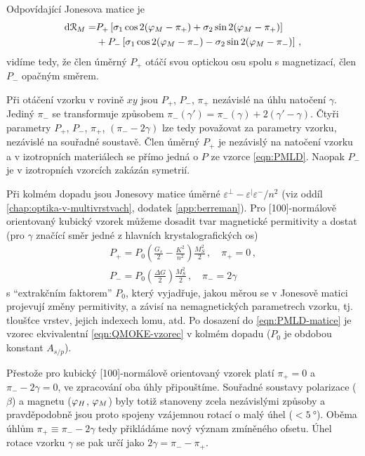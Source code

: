 Odpovídající Jonesova matice je 
\begin{align}
    \label{eqn:dR-kubicky}
    \textrm{d}\mathcal{R}_M = &P_+ \left[\sigma_1\cos2(\varphi_M-\pi_+) + \sigma_2 \sin2(\varphi_M-\pi_+)\right] \\ 
                              & + P_- \left[\sigma_1\cos2(\varphi_M-\pi_-) - \sigma_2 \sin2(\varphi_M-\pi_-) \right] \,,
\end{align}
vidíme tedy, že člen úměrný $P_+$ otáčí svou optickou osu spolu s magnetizací, člen $P_-$ opačným směrem.

Při otáčení vzorku v rovině $xy$ jsou $P_+$, $P_-$, $\pi_+$ nezávislé na úhlu natočení $\gamma$.
Jediný $\pi_-$ se transformuje způsobem $\pi_-(\gamma')=\pi_-(\gamma)+2(\gamma'-\gamma)$.
Čtyři parametry $P_+$, $P_-$, $\pi_+$, $(\pi_--2\gamma)$ lze tedy považovat za parametry vzorku, nezávislé na souřadné soustavě.
Člen úměrný $P_+$ je nezávislý na natočení vzorku a v izotropních materiálech se přímo jedná o $P$ ze vzorce \ref{eqn:PMLD}.
Naopak $P_-$ je v izotropních vzorcích zakázán symetrií.

Při kolmém dopadu jsou Jonesovy matice úměrné $\varepsilon^\perp-\varepsilon^\vert\varepsilon^-/n^2$ (viz oddíl \ref{chap:optika-v-multivrstvach}, dodatek \ref{app:berreman}).
Pro [100]-normálově orientovaný kubický vzorek můžeme dosadit tvar magnetické permitivity a dostat (pro $\gamma$ značící směr jedné z hlavních krystalografických os)
\begin{align}
    \label{eqn:PMLD-kubicke}
    P_+ = P_0 \left(\frac{G_s}{2} - \frac{K^2}{n^2}\right) \frac{M_S^2}{2} \,,\quad \pi_+=0 \,,\\
    P_- = P_0 \left(\frac{\Delta G}{2}\right) \frac{M_S^2}{2} \,,\quad \pi_-=2\gamma
\end{align}
s ``extrakčním faktorem'' $P_0$, který vyjadřuje, jakou měrou se v Jonesově matici projevují změny permitivity, a závisí na nemagnetických parametrech vzorku, tj. tloušťce vrstev, jejich indexech lomu, atd.
Po dosazení do \eqref{eqn:PMLD-matice} je vzorec ekvivalentní \eqref{eqn:QMOKE-vzorec} v kolmém dopadu ($P_0$ je obdobou konstant $A_{s/p}$).

Přestože pro kubický [100]-normálově orientovaný vzorek platí $\pi_+=0$ a $\pi_--2\gamma=0$, ve zpracování oba úhly připouštíme.
Souřadné soustavy polarizace ($\beta$) a magnetu ($\varphi_H$, $\varphi_M$) byly totiž stanoveny zcela nezávislými způsoby a pravděpodobně jsou proto spojeny vzájemnou rotací o malý úhel ($<\SI{5}{\degree}$).
Oběma úhlům $\pi_+ \equiv \pi_--2\gamma$ tedy přikládáme nový význam zmíněného ofsetu.
Úhel rotace vzorku $\gamma$ se pak určí jako $2\gamma = \pi_- - \pi_+$.

